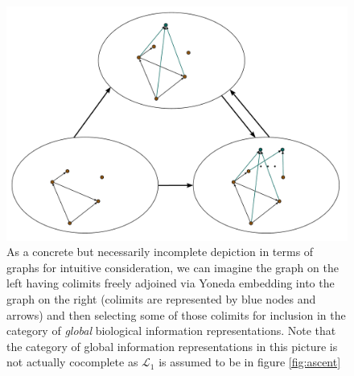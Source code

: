 \documentclass[aps,twocolumn]{revtex4-1}
\begin{document}
\begin{figure}
\noindent\includegraphics[width=1.0\columnwidth]{fig/graphyonedaext.pdf}
\caption{As a concrete but necessarily incomplete depiction in terms of graphs for intuitive consideration, we can imagine the graph on the left having colimits freely adjoined via Yoneda embedding into the graph on the right (colimits are represented by blue nodes and arrows) and then selecting some of those colimits for inclusion in the category of {\it global} biological information representations. Note that the category of global information representations in this picture is not actually cocomplete as $\mathcal{L}_1$ is assumed to be in figure \ref{fig:ascent}}
\label{fig:graphyonedaext}
\end{figure}
\end{document}
